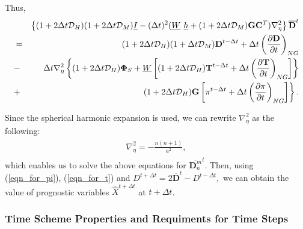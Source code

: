 Thus, \begin{eqnarray}\begin{aligned}
      & &\left\{ ( 1+2\Delta t {\mathcal D}_H )( 1+2\Delta t {\mathcal D}_M )
           \underline{I}
      - ( \Delta t )^{2}  ( \underline{W} \ \underline{h}
           + (1+2\Delta t {\mathcal D}_M)
             {\mathbf{G}} {\mathbf{C}}^{T} ) \nabla^{2}_{\eta}
  \right\}
      \overline{ {\mathbf{D}} }^{t} \notag\\
  &=& ( 1+2\Delta t {\mathcal D}_H )( 1+\Delta t {\mathcal D}_M )
       {\mathbf{D}}^{t-\Delta t}
  + \Delta t
     \left( \frac{\partial {\mathbf{D}}}{\partial t} \right)_{NG}  \notag\\
  &-&  \Delta t \nabla^{2}_{\eta}
                   \left\{  ( 1+2\Delta t {\mathcal D}_H ) {\mathbf{\Phi}}_{S}
                          + \underline{W}
                            \left[ ( 1+2\Delta t {\mathcal D}_H )
                                    {\mathbf{T}}^{t-\Delta t}
                                  + \Delta t
                                      \left( \frac{\partial {\mathbf{T}}}
                                                  {\partial t}
                                      \right)_{NG} \right]
                   \right\} \notag \\
                 &+& \hspace{1.4cm} \left. ( 1+2\Delta t {\mathcal D}_H ) {\mathbf{G}}
                            \left[ \pi^{t-\Delta t}
                                  + \Delta t \left( \frac{\partial \pi}{\partial t}
                                  \right)_{NG}  \right]
                                  \right\}.\end{aligned}\end{eqnarray}

Since the spherical harmonic expansion is used, we can rewrite \(\nabla_{\eta}^2\) as the following: \begin{eqnarray}\begin{aligned}
\nabla_{\eta}^2=-\frac{n(n+1)}{a^2},\end{aligned}\end{eqnarray} which enables us to solve the above equations for \(\overline{ {\mathbf{D}}_n^m }^{t}\). Then, using (\ref{eqn_for_pi}),
(\ref{eqn_for_t}) and \(D^{t+\Delta t} = 2\overline{ {\mathbf{D}} }^{t} - D^{t-\Delta t},\) we can obtain the value of prognostic variables \(\hat{X}^{t+\Delta t}\) at \(t+\Delta t\).

\hypertarget{time-scheme-properties-and-requiments-for-time-steps}{%
\subsubsection{Time Scheme Properties and Requiments for Time Steps}\label{time-scheme-properties-and-requiments-for-time-steps}}

